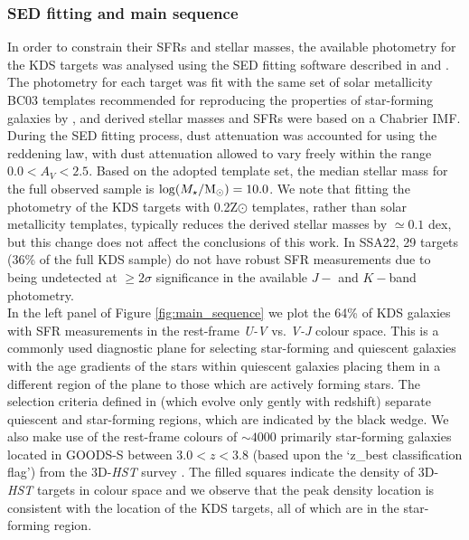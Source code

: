 \documentclass[fleqn,usenatbib]{mn2e}
\begin{document}
\subsubsection{SED fitting and main sequence}\label{subsubsec:sed_fitting}
In order to constrain their SFRs and stellar masses, the available photometry for the KDS targets was analysed using the SED fitting software described in \cite{McLure2011} and \cite{McLeod2015}.
The photometry for each target was fit with the same set of solar metallicity BC03 \citep{Bruzual2003} templates recommended for reproducing the properties of star-forming galaxies by \cite{Wuyts2011a}, and derived stellar masses and SFRs were based on a Chabrier IMF.
During the SED fitting process, dust attenuation was accounted for using the \cite{Calzetti2000} reddening law, with dust attenuation allowed to vary freely within the range $0.0<A_{V}<2.5$.
Based on the adopted template set, the median stellar mass for the full observed sample is $\log(M_{\star}/{\rm M}_{\odot}) = 10.0$. 
We note that fitting the photometry of the KDS targets with 0.2Z$\odot$ templates, rather than solar metallicity templates, typically reduces the derived stellar masses by $\simeq 0.1$ dex, but this change does not affect the conclusions of this work.
In SSA22, 29 targets (36\% of the full KDS sample) do not have robust SFR measurements due to being undetected at $\geq 2\sigma$ significance in the available $J-$ and $K-$band photometry. \\

In the left panel of Figure \ref{fig:main_sequence} we plot the 64\% of KDS galaxies with SFR measurements in the rest-frame {\it U-V} vs. {\it V-J} colour space.
This is a commonly used diagnostic plane for selecting star-forming and quiescent galaxies \citep[e.g.][]{Williams2009,Brammer2011,Whitaker2012a} with the age gradients of the stars within quiescent galaxies placing them in a different region of the plane to those which are actively forming stars.
The selection criteria defined in \cite{Whitaker2012a} (which evolve only gently with redshift) separate quiescent and star-forming regions, which are indicated by the black wedge.
We also make use of the rest-frame colours of $\sim4000$ primarily star-forming galaxies located in GOODS-S between $3.0 < z < 3.8$ (based upon the `z\_best classification flag') from the 3D-{\em HST} survey \citep{Brammer2012,Momcheva2016}.
The filled squares indicate the density of 3D-{\em HST} targets in colour space and we observe that the peak density location is consistent with the location of the KDS targets, all of which are in the star-forming region. 
\end{document}
